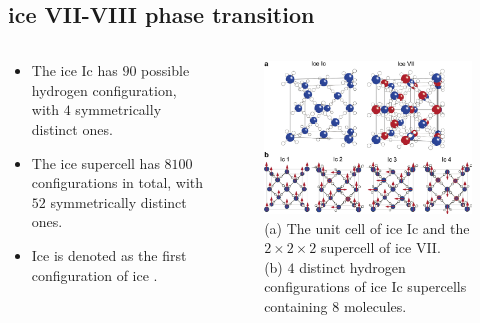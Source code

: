 \documentclass[13pt,aspectratio=169]{beamer}
\newcommand*{\RMN}[1]{\uppercase\expandafter{\romannumeral#1}}
\begin{document}
\subsection{ice VII-VIII phase transition}
\begin{frame}{\subsecname}
	\begin{columns}
		\begin{column}{0.5\textwidth}
			\begin{itemize}
				\item The ice Ic has $90$ possible hydrogen configuration, with $4$ symmetrically distinct ones.
				\item The ice \RMN{7} supercell has $8100$ configurations in total, with $52$ symmetrically distinct ones.
				\item Ice \RMN{8} is denoted as the first configuration of ice \RMN{7}.
			\end{itemize}
		\end{column}

		\begin{column}{0.45\textwidth}
			\vspace{\topsep}
			\begin{figure}
				\includegraphics[width=\columnwidth]{images/ice7}%
				\captionsetup{singlelinecheck=off}
				\caption{(a) The unit cell of ice Ic and the $2\times 2\times 2$ supercell of ice VII.\\
					(b) $4$ distinct hydrogen configurations of ice Ic supercells containing $8$ molecules.}
			\end{figure}
		\end{column}
	\end{columns}
\end{frame}
\end{document}
